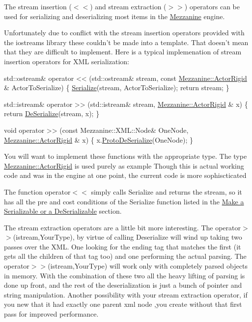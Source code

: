 The stream insertion ($<$$<$) and stream extraction ($>$$>$) operators can be used for serializing and deserializing most items in the \hyperlink{namespaceMezzanine}{Mezzanine} engine.

Unfortunately due to conflict with the stream insertion operators provided with the iostreams library these couldn't be made into a template. That doesn't mean that they are difficult to implement. Here is a typical implemenation of stream insertion operators for X\-M\-L serialization\-: 
\begin{DoxyCode}
std::ostream& operator << (std::ostream& stream, \textcolor{keyword}{const} \hyperlink{classMezzanine_1_1ActorRigid}{Mezzanine::ActorRigid}
      & ActorToSerialize)
\{
    \hyperlink{namespaceMezzanine_a9015c5e668e14b857a27888c56934148}{Serialize}(stream, ActorToSerialize);
    \textcolor{keywordflow}{return} stream;
\}

std::istream& operator >> (std::istream& stream, \hyperlink{classMezzanine_1_1ActorRigid}{Mezzanine::ActorRigid}
      & x)
    \{ \textcolor{keywordflow}{return} \hyperlink{namespaceMezzanine_ad8989ea81ccd1ad6d59a11921f0239a4}{DeSerialize}(stream, x); \}

\textcolor{keywordtype}{void} operator >> (\textcolor{keyword}{const} Mezzanine::XML::Node& OneNode, \hyperlink{classMezzanine_1_1ActorRigid}{Mezzanine::ActorRigid}
      & x)
    \{ x.\hyperlink{classMezzanine_1_1ActorRigid_abec93275a1d839ade34a142b090aea31}{ProtoDeSerialize}(OneNode); \}
\end{DoxyCode}
 You will want to implement these functions with the appropriate type. The type \hyperlink{classMezzanine_1_1ActorRigid}{Mezzanine\-::\-Actor\-Rigid} is used purely as example Though this is actual working code and was in the engine at one point, the current code is more sophiscticated \par
 \par
 The function operator$<$$<$ simply calls Serialize and returns the stream, so it has all the pre and cost conditions of the Serialize function listed in the \hyperlink{serialization.h_serializationmaking}{Make a Serializable or a De\-Serializable} section. \par
 \par
 The stream extraction operators are a little bit more interesting. The operator$>$$>$(istream,\-Your\-Type), by virtue of calling Deserialize will wind up taking two passes over the X\-M\-L. One looking for the ending tag that matches the first (it gets all the children of that tag too) and one performing the actual parsing. The operator$>$$>$(istream,\-Your\-Type) will work only with completely parsed objects in memory. With the combination of these two all the heavy lifting of parsing is done up front, and the rest of the deserialization is just a bunch of pointer and string manipulation. Another possibility with your stream extraction operator, if you new that it had exactly one parent xml node ,you create without that first pass for improved performance. 

